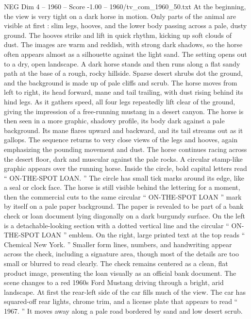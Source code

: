 \begin{textsample}{NEG Dim 4 – 1960 – Score -1.00 – 1960/tv\_com\_1960\_50.txt}  \label{ex:f4_neg_033}
At the beginning, the view is very tight on a dark horse in motion.
Only parts of the animal are visible at first : slim legs, hooves, and the lower body passing across a pale, dusty ground.
The hooves strike and lift in quick rhythm, kicking up soft clouds of dust.
The images are warm and reddish, with strong dark shadows, so the horse often appears almost as a silhouette against the light sand.
The setting opens out to a dry, open landscape.
A dark horse stands and then runs along a flat sandy path at the base of a rough, rocky hillside.
Sparse desert shrubs dot the ground, and the background is made up of pale cliffs and scrub.
The horse moves from left to right, its head forward, mane and tail trailing, with dust rising behind its hind legs.
As it gathers speed, all four legs repeatedly lift clear of the ground, giving the impression of a free-running mustang in a desert canyon.
The horse is then seen in a more graphic, shadowy profile, its body dark against a pale background.
Its mane flares upward and backward, and its tail streams out as it gallops.
The sequence returns to very close views of the legs and hooves, again emphasizing the pounding movement and dust.
The horse continues racing across the desert floor, dark and muscular against the pale rocks.
A circular stamp-like graphic appears over the running horse.
Inside the circle, bold capital letters read “ ON-THE-SPOT LOAN. ” The circle has small tick marks around its edge, like a seal or clock face.
The horse is still visible behind the lettering for a moment, then the commercial cuts to the same circular “ ON-THE-SPOT LOAN ” mark by itself on a pale paper background.
The paper is revealed to be part of a bank check or loan document lying diagonally on a dark burgundy surface.
On the left is a detachable-looking section with a dotted vertical line and the circular “ ON-THE-SPOT LOAN ” emblem.
On the right, large printed text at the top reads “ Chemical New York. ” Smaller form lines, numbers, and handwriting appear across the check, including a signature area, though most of the details are too small or blurred to read clearly.
The check remains centered as a clean, flat product image, presenting the loan visually as an official bank document.
The scene changes to a red 1960s Ford Mustang driving through a bright, arid landscape.
At first the rear-left side of the car fills much of the view.
The car has squared-off rear lights, chrome trim, and a license plate that appears to read “ 1967. ” It moves away along a pale road bordered by sand and low desert scrub.

\end{textsample}

